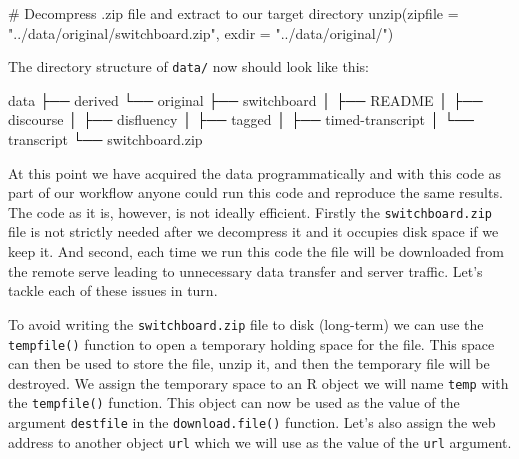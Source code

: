 \documentclass[
  letterpaper,
]{latex/krantz}
\newenvironment{Shaded}{\begin{snugshade}}{\end{snugshade}}
\newcommand{\AttributeTok}[1]{\textcolor[rgb]{0.40,0.45,0.13}{#1}}
\newcommand{\CommentTok}[1]{\textcolor[rgb]{0.37,0.37,0.37}{#1}}
\newcommand{\ExtensionTok}[1]{\textcolor[rgb]{0.00,0.23,0.31}{#1}}
\newcommand{\FunctionTok}[1]{\textcolor[rgb]{0.28,0.35,0.67}{#1}}
\newcommand{\NormalTok}[1]{\textcolor[rgb]{0.00,0.23,0.31}{#1}}
\newcommand{\StringTok}[1]{\textcolor[rgb]{0.13,0.47,0.30}{#1}}
\begin{document}
\begin{Shaded}
\begin{Highlighting}[]
\CommentTok{\# Decompress .zip file and extract to our target directory}
\FunctionTok{unzip}\NormalTok{(}\AttributeTok{zipfile =} \StringTok{"../data/original/switchboard.zip"}\NormalTok{, }\AttributeTok{exdir =} \StringTok{"../data/original/"}\NormalTok{)}
\end{Highlighting}
\end{Shaded}

The directory structure of \texttt{data/} now should look like this:

\begin{Shaded}
\begin{Highlighting}[]
\ExtensionTok{data}
\ExtensionTok{├──}\NormalTok{ derived}
\ExtensionTok{└──}\NormalTok{ original}
    \ExtensionTok{├──}\NormalTok{ switchboard}
    \ExtensionTok{│}\NormalTok{   ├── README}
    \ExtensionTok{│}\NormalTok{   ├── discourse}
    \ExtensionTok{│}\NormalTok{   ├── disfluency}
    \ExtensionTok{│}\NormalTok{   ├── tagged}
    \ExtensionTok{│}\NormalTok{   ├── timed{-}transcript}
    \ExtensionTok{│}\NormalTok{   └── transcript}
    \ExtensionTok{└──}\NormalTok{ switchboard.zip}
\end{Highlighting}
\end{Shaded}

At this point we have acquired the data programmatically and with this
code as part of our workflow anyone could run this code and reproduce
the same results. The code as it is, however, is not ideally efficient.
Firstly the \texttt{switchboard.zip} file is not strictly needed after
we decompress it and it occupies disk space if we keep it. And second,
each time we run this code the file will be downloaded from the remote
serve leading to unnecessary data transfer and server traffic. Let's
tackle each of these issues in turn.

To avoid writing the \texttt{switchboard.zip} file to disk (long-term)
we can use the \texttt{tempfile()} function to open a temporary holding
space for the file. This space can then be used to store the file, unzip
it, and then the temporary file will be destroyed. We assign the
temporary space to an R object we will name \texttt{temp} with the
\texttt{tempfile()} function. This object can now be used as the value
of the argument \texttt{destfile} in the \texttt{download.file()}
function. Let's also assign the web address to another object
\texttt{url} which we will use as the value of the \texttt{url}
argument.
\end{document}
